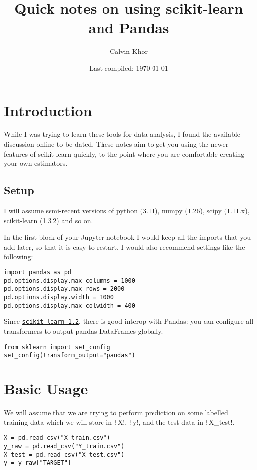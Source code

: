 \documentclass[11pt]{article}
\theoremstyle{definition}
\newcommand{\myhref}[2]{\href{#1}{\texttt{#2}}}
\begin{document}
\title{Quick notes on using scikit-learn and Pandas}
\author{Calvin Khor}

\date{Last compiled: \today}
\maketitle

\section{Introduction}
While I was trying to learn these tools for data analysis, I found the available discussion online to be dated. These notes aim to get you using the newer features of scikit-learn quickly, to the point where you are comfortable creating your own estimators.
\subsection{Setup}
I will assume semi-recent versions of python (3.11), numpy (1.26), scipy (1.11.x), scikit-learn (1.3.2) and so on.

In the first block of your Jupyter notebook I would keep all the imports that you add later, so that it is easy to restart. I would also recommend settings like the following:
\begin{verbatim}
import pandas as pd
pd.options.display.max_columns = 1000
pd.options.display.max_rows = 2000
pd.options.display.width = 1000
pd.options.display.max_colwidth = 400
\end{verbatim}
Since \myhref{https://scikit-learn.org/stable/auto_examples/release_highlights/plot_release_highlights_1_2_0.html}{scikit-learn 1.2}, there is good interop with Pandas: you can configure all transformers to output pandas DataFrames globally.
\begin{verbatim}
from sklearn import set_config
set_config(transform_output="pandas")
\end{verbatim}

\section{Basic Usage}
We will assume that we are trying to perform prediction on some labelled training data which we will store in \texttt!X!, \texttt!y!, and the test data in \texttt!X_test!.
\begin{verbatim}
X = pd.read_csv("X_train.csv") 
y_raw = pd.read_csv("Y_train.csv")  
X_test = pd.read_csv("X_test.csv")
y = y_raw["TARGET"]
\end{verbatim}
\end{document}
